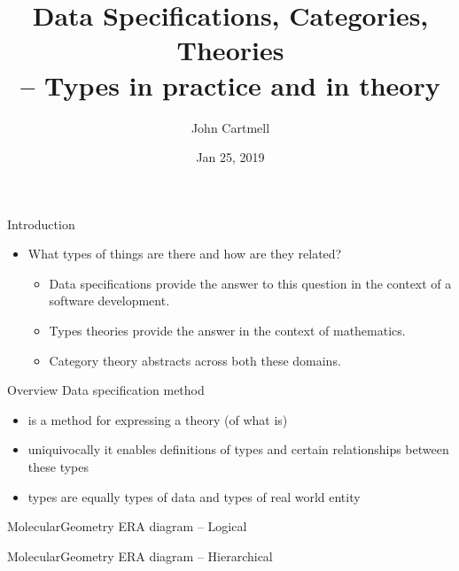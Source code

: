 \documentclass[xcolor=pst,dvips]{beamer}   %
\title[Types in practice and in theory]{Data Specifications, Categories, Theories\\ -- Types in practice and in theory}
\author{John Cartmell}
\institute{Otium}
\date{Jan 25, 2019}
\renewcommand{\erpictureFolder}[0]{../SharedPictures}
\begin{document}
\begin{frame}
\titlepage
\end{frame}

\iffalse
\AtBeginSubsection[]
{
  \begin{frame}<beamer>
    \frametitle{Layout}
    \tableofcontents[currentsection,currentsubsection]
  \end{frame}
} 
\begin{frame}{Table of Contents}
\tableofcontents
\end{frame}
\fi



\begin{frame}{Introduction}
\begin{itemize}
\item
What types of things are there and how are they related? 
\begin{itemize}
\pause \item Data specifications provide the answer to this question in the context of a software development. 
\pause \item Types theories provide the answer in the context of mathematics. 
\pause \item Category theory abstracts across both these domains.
\end{itemize}
\end{itemize}

\end{frame}
\begin{frame}{Overview}
Data specification method 
\begin{itemize}
\item is a method for expressing a  theory (of what is)
\item uniquivocally it enables definitions of types and certain relationships between these types
\item types are equally types of data and types of real world entity
\end{itemize}
\end{frame}

\begin{frame}{MolecularGeometry ERA diagram  -- Logical }
\begin{center}
\scalebox{0.5}{

}
\end{center}
\end{frame}

\begin{frame}{MolecularGeometry ERA diagram -- Hierarchical}
\begin{center}
\scalebox{0.5}{

}
\end{center}
\end{frame}
\end{document}
